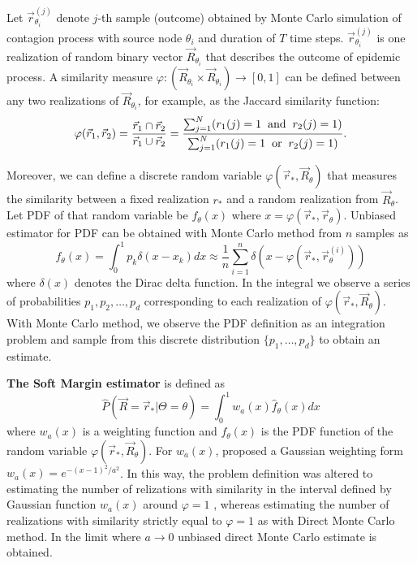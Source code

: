 \documentclass[times, utf8, diplomski]{fer}
\begin{document}
Let $\vec r^{(j)}_{\theta_i}$ denote $j$-th sample (outcome) obtained by Monte Carlo simulation of contagion process with source node $\theta_i$ and duration of $T$ time steps. $\vec r^{(j)}_{\theta_i}$ is one realization of random binary vector $\vec R_{\theta_i}$ that describes the outcome of epidemic process. A similarity measure $\varphi : (\vec R_{\theta_i} \times \vec R_{\theta_i}) \rightarrow [0, 1 ]$  can  be defined between any two  realizations of $\vec R_{\theta_i}$, for example,  as the Jaccard similarity function:
\begin{equation}
\varphi(\vec r_1, \vec r_2) = \frac{\vec r_1 \cap \vec r_2}{\vec r_1 \cup \vec r_2 } = \frac{\sum_{j = 1}^{N} (r_1(j) = 1 \hspace{2mm} \text{and} \hspace{2mm} r_2(j) = 1) }{\sum_{j = 1}^{N} (r_1(j) = 1 \hspace{2mm} \text{or} \hspace{2mm} r_2(j) = 1) }.
\label{JaccardPHI}
\end{equation}

Moreover, we  can define a discrete random variable $\varphi(\vec r_*, \vec R_{\theta})$ that measures the similarity between a fixed realization $r_*$ and a random realization from $\vec R_{\theta}$. Let PDF of that random variable be $f_\theta(x)$ where $x = \varphi(\vec r_*, \vec r_{\theta})$. Unbiased estimator for PDF can be obtained with Monte Carlo method from $n$  samples as 
\begin{equation}
f_{\theta}(x) = \int_0^1 p_k \delta(x - x_k)dx \approx \frac{1}{n} \sum_{i = 1}^{n} \delta(x - \varphi(\vec r_*, \vec r_{\theta} ^{(i)}))
\label{Fapprox}
\end{equation}
where $\delta(x)$ denotes the Dirac delta function. In the integral we observe a series of probabilities $p_1, p_2, \ldots, p_d$ corresponding to each realization of $\varphi(\vec r_*, \vec R_{\theta})$. With Monte Carlo method, we observe the PDF definition as an integration problem and sample from this discrete distribution $\{p_1, \ldots, p_d\}$ to obtain an estimate.

\textbf{The Soft Margin estimator} is defined as 
\begin{equation}
\hat{P}(\vec R = \vec r_* | \Theta = \theta) = \int_0^1 w_a(x)\hat{f}_\theta(x)dx
\label{SMF1}
\end{equation}
where $w_a(x)$ is a weighting function and $f_\theta(x)$ is the PDF function of the random variable $\varphi(\vec r_*, \vec R_\theta)$. For $w_a(x)$, \cite{Nino} proposed a Gaussian weighting form $w_a(x) = e^{-(x -1)^2 / a ^2}$. In this way, the problem definition was altered to estimating the number of relizations with similarity in the interval defined by Gaussian function $w_a(x)$ around $\varphi = 1$ , whereas estimating the number of realizations with similarity strictly equal to $\varphi = 1$ as with Direct Monte Carlo method. In the limit where $a \rightarrow 0$ unbiased direct Monte Carlo estimate is obtained.
\end{document}
